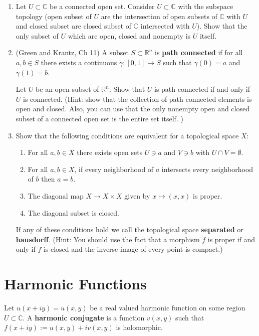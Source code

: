\documentclass[a4paper,10pt]{article}
\newcommand{\RR}{\mathbb{R}}
\newcommand{\CC}{\mathbb{C}}
\begin{document}
\begin{enumerate}
	\item Let $U \subset \CC$ be a connected open set. Consider $U\subset \CC$ with the subspace topology (open subset of $U$ are the intersection of open subsets of $\CC$ with $U$ and closed subset are closed subset of $\CC$ intersected with $U$). Show that the only subset of $U$ which are open, closed and nonempty is $U$ itself. 
	
	\item (Green and Krantz, Ch 11) A subset $S \subset \RR^n$ is \textbf{path connected} if for all $a,b \in S$ there exists a continuous $\gamma: [0,1] \to S$ such that $\gamma(0) = a$ and $\gamma(1) = b$. 
	
	Let $U$ be an open subset of $\RR^n$. Show that $U$ is path connected if and only if $U$ is connected. (Hint: show that the collection of path connected elements is open and closed. Also, you can use that the only nonempty open and closed subset of a connected open set is the entire set itself. )
	\item 
	Show that the following conditions are equivalent for a topological space $X$:
	\begin{enumerate}
		\item For all $a,b \in X$ there exists open sets $U \owns a$ and $V \owns b$ with $U \cap V = \emptyset$. 
		\item For all $a,b\in X$, if every neighborhood of $a$ intersects every neighborhood of $b$ then $a = b$.
		\item The diagonal map $X \to X\times X$ given by $x\mapsto (x,x)$ is proper. 
		\item The diagonal subset is closed. 
	\end{enumerate}
	
	
	If any of these conditions hold we call the topological space \textbf{separated} or \textbf{hausdorff}. (Hint: You should use the fact that a morphism $f$ is proper if and only if $f$ is closed and the inverse image of every point is compact.)
	
\end{enumerate}

\newpage
\section{Harmonic Functions}

Let $u(x+iy)=u(x,y)$ be a real valued harmonic function on some region $U \subset \CC$.
A \textbf{harmonic conjugate} is a function $v(x,y)$ such that $f(x+iy):= u(x,y) + i v(x,y)$ is holomorphic.
\end{document}
